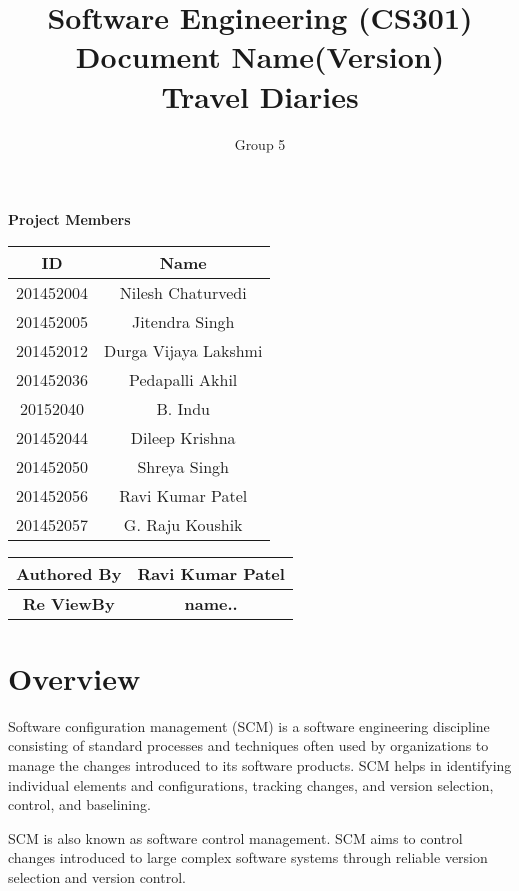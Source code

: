 \documentclass[]{article}
\title{Software Engineering (CS301)\\ Document Name(Version)\\Travel Diaries}
\author{Group 5}
\begin{document}
\maketitle


\begin{center}
\textbf{Project Members}\\
\vspace*{.6cm}
\begin{tabular}{|c|c|}
\hline
\textbf{ID} & \textbf{Name}\\
\hline
\hline
201452004 & Nilesh Chaturvedi\\
\hline
201452005 & Jitendra Singh\\
\hline
201452012 & Durga Vijaya Lakshmi\\
\hline
201452036 & Pedapalli Akhil\\
\hline
20152040 & B. Indu\\
\hline
201452044 & Dileep Krishna\\
\hline
201452050 & Shreya Singh\\
\hline
201452056 & Ravi Kumar Patel\\
\hline
201452057 & G. Raju Koushik\\
\hline
\end{tabular}

\vspace*{1cm}

\begin{tabular}{|c|c|}
\hline
\textbf{Authored By} & \textbf{Ravi Kumar Patel}\\
\hline
\textbf{Re ViewBy} & \textbf{name..}\\
\hline

\end{tabular}
\end{center}

\newpage
\tableofcontents
\newpage

\section{Overview}
Software configuration management (SCM) is a software engineering discipline consisting of standard processes and techniques often used by organizations to manage the changes introduced to its software products. SCM helps in identifying individual elements and configurations, tracking changes, and version selection, control, and baselining.

SCM is also known as software control management. SCM aims to control changes introduced to large complex software systems through reliable version selection and version control.
\end{document}
